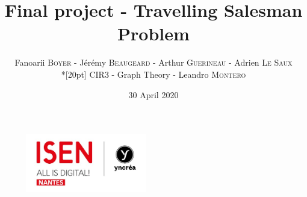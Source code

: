 \documentclass[a4paper, 12pt]{report}
\title{Final project - Travelling Salesman Problem}
\author{Fanoarii \textsc{Boyer} - Jérémy \textsc{Beaugeard} - Arthur \textsc{Guerineau} - Adrien \textsc{Le Saux} \\*[20pt] CIR3 - Graph Theory - Leandro \textsc{Montero}}
\date{30 April 2020}
\begin{document}
	\begin{titlepage}
		\begin{figure}
			\begin{center}
				\includegraphics[width=150pt]{isen.png}
				\maketitle
			\end{center}
		\end{figure}
	\end{titlepage}

	\tableofcontents
	
\end{document}
